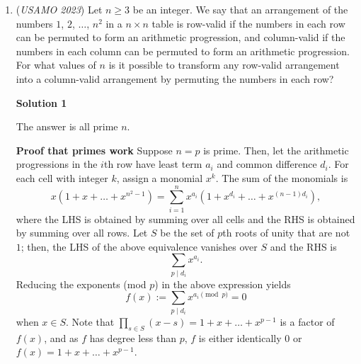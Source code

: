\begin{enumerate}
 1. "If"

 Alice can apply a similar strategy to the strategy used in case 2. On any move, Alice will add $a$ to $n$ if and only if $v_2 (n)=v_2 (a)$. If she does this addition, then $v_2 (n') \geq v_2 (a)+1$, keeping an even number on the board. Even if Bob divides $n'$ until $v_2 (n)=v_2 (a)$, Alice will apply the same strategy and keep $v_2 (n') \geq v_2 (a)+1$. Alice's use of this strategy ensures that there always exists some number n on the board such that $v_2 (n) \geq v_2 (a)$, ensuring there always exists an even number n on the board.

 2."Only If"

 If $v_2 (n) < v_2 (a)$ for all n on the board, this means that Alice can never change the value of $v_2 (n)$ for any $n$ on the board. Only Bob can do this, and Bob will subtract $1$ from each $v_2 (n)$ until they are all equal to $0$ (all odd), ending the game.

 We've shown that the game can last indefinitely iff there exists some number $n$ on the board such that $v_2 (n) \geq v_2 (a)$, and have shown that Alice can ensure the game lasts forever in these scenarios using the above strategy. This proves the contrapositive, proving the claim.

 


	\item (\textit{USAMO 2023}) Let $n\geq3$ be an integer. We say that an arrangement of the numbers $1$, $2$, $\dots$, $n^2$ in a $n \times n$ table is row-valid if the numbers in each row can be permuted to form an arithmetic progression, and column-valid if the numbers in each column can be permuted to form an arithmetic progression. For what values of $n$ is it possible to transform any row-valid arrangement into a column-valid arrangement by permuting the numbers in each row?


 



\textbf{Solution 1}

The answer is all $\boxed{\text{prime } n}$.

 \textbf{Proof that primes work} Suppose $n=p$ is prime. Then, let the arithmetic progressions in the $i$th row have least term $a_i$ and common difference $d_i$. For each cell with integer $k$, assign a monomial $x^k$. The sum of the monomials is 
 \[x(1+x+\ldots+x^{n^2-1}) = \sum_{i=1}^n x^{a_i}(1+x^{d_i}+\ldots+x^{(n-1)d_i}),\] where the LHS is obtained by summing over all cells and the RHS is obtained by summing over all rows. Let $S$ be the set of $p$th roots of unity that are not $1$; then, the LHS of the above equivalence vanishes over $S$ and the RHS is 
 \[\sum_{p \mid d_i} x^{a_i}.\] Reducing the exponents (mod $p$) in the above expression  yields 
 \[f(x) := \sum_{p \mid d_i} x^{a_i \pmod{p}} = 0\] when $x \in S$. Note that $\prod_{s \in S} (x-s)=1+x+\ldots+x^{p-1}$ is a factor of $f(x)$, and as $f$ has degree less than $p$, $f$ is either identically 0 or $f(x)=1+x+\ldots+x^{p-1}$. 


\end{enumerate}
